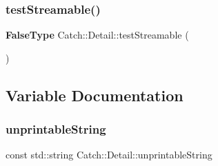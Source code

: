 \mbox{\label{namespace_catch_1_1_detail_aac81f01b0d687f75b8f24a925591b7ac}} 
\subsubsection{test\+Streamable()\hspace{0.1cm}{\footnotesize\ttfamily [2/2]}}
{\footnotesize\ttfamily \textbf{ False\+Type} Catch\+::\+Detail\+::test\+Streamable (\begin{DoxyParamCaption}\item[{\textbf{ False\+Type}}]{ }\end{DoxyParamCaption})}



\subsection{Variable Documentation}
\mbox{\label{namespace_catch_1_1_detail_a466775f4eec29ffef29ab334cd885136}} 
\subsubsection{unprintable\+String}
{\footnotesize\ttfamily const std\+::string Catch\+::\+Detail\+::unprintable\+String}

